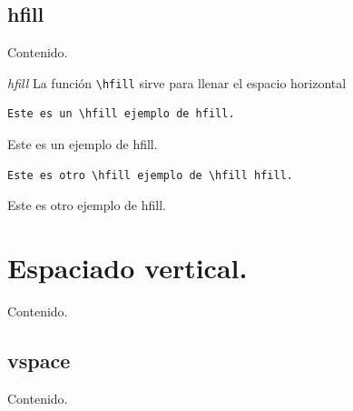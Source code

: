 \documentclass[dvipsnames,xcolor, handout]{beamer}
\theoremstyle{plain}
\theoremstyle{definition}
\begin{document}
\subsection{hfill}
\begin{frame}{Contenido.}
 \begin{footnotesize}
\vspace*{-1cm}
\begin{multicols}{2}
  \tableofcontents[currentsubsection]
\end{multicols}
\end{footnotesize}
\end{frame}

\begin{frame}[fragile]{\itshape hfill}
La función \verb!\hfill! sirve para llenar el espacio horizontal
    
\begin{verbatim}
Este es un \hfill ejemplo de hfill.    
\end{verbatim}

Este es un \hfill ejemplo de hfill.    \pause

\begin{verbatim}
Este es otro \hfill ejemplo de \hfill hfill.    
\end{verbatim}

Este es otro \hfill ejemplo de \hfill hfill.    

\end{frame}

\section{Espaciado vertical.}
\begin{frame}{Contenido.}
  \begin{footnotesize}
\vspace*{-1cm}
\begin{multicols}{2}
  \tableofcontents[currentsection]
\end{multicols}
\end{footnotesize}
\end{frame}

\subsection{vspace}
\begin{frame}{Contenido.}
 \begin{footnotesize}
\vspace*{-1cm}
\begin{multicols}{2}
  \tableofcontents[currentsubsection]
\end{multicols}
\end{footnotesize}
\end{frame}
\end{document}
